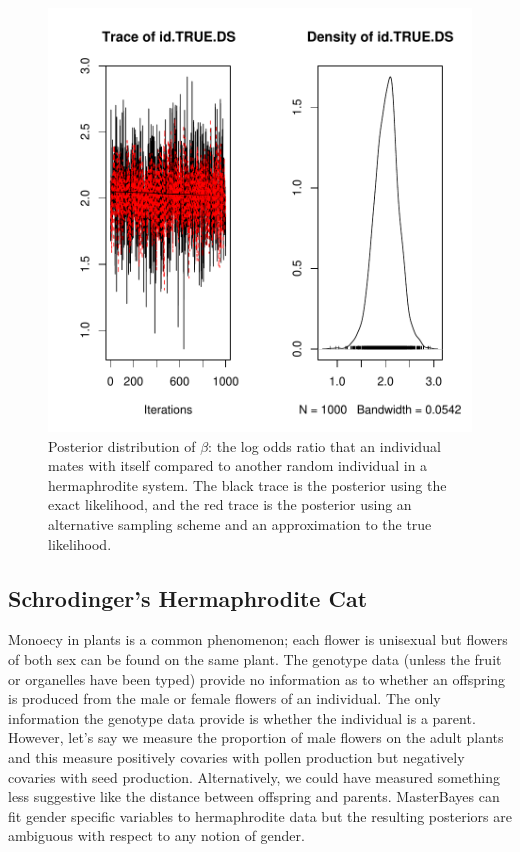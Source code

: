 \documentclass{article}
\begin{document}
\begin{figure}[!h]
\begin{center}
\includegraphics{Tutorial-101}
\end{center}
\caption{Posterior distribution of $\beta$: the log odds ratio that an individual mates with itself compared to another random individual in a hermaphrodite system. The black trace is the posterior using the exact likelihood, and the red trace is the posterior using an alternative sampling scheme and an approximation to the true likelihood.}
\label{Herm.approx-fig}
\end{figure}
 

\subsection{Schrodinger's Hermaphrodite Cat}
\label{SHC}

Monoecy in plants is a common phenomenon; each flower is unisexual but flowers of both sex can be found on the same plant.  The genotype data (unless the fruit or organelles have been typed) provide no information as to whether an offspring is produced from the male or female flowers of an individual. The only information the genotype data provide is whether the individual is a parent.  However, let's say we measure the proportion of male flowers on the adult plants and this measure positively covaries with pollen production but negatively covaries with seed production.  Alternatively, we could have measured something less suggestive like the distance between offspring and parents.  MasterBayes can fit gender specific variables to hermaphrodite data but the resulting posteriors are ambiguous with respect to any notion of gender.\\
\end{document}
